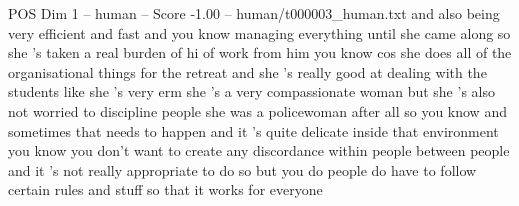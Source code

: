 \begin{textsample}{POS Dim 1 – human – Score -1.00 – human/t000003\_human.txt}  \label{ex:f1_pos_011}
and also being very efficient and fast and you know managing everything until she came along so she 's taken a real burden of hi of work from him you know cos she does all of the organisational things for the retreat and she 's really good at dealing with the students like she 's very erm she 's a very compassionate woman but she 's also not worried to discipline people she was a policewoman after all so you know and sometimes that needs to happen and it 's quite delicate inside that environment you know you don't want to create any discordance within people between people and it 's not really appropriate to do so but you do people do have to follow certain rules and stuff so that it works for everyone

\end{textsample}
